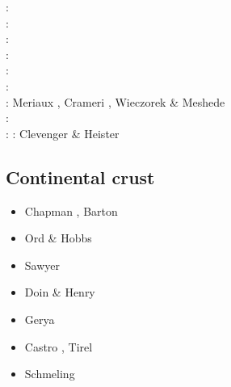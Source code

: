 \begin{scriptsize}
\twothousandtwelve: \cite{crsg12}\cite{chgv12}\cite{krwd12}\cite{may12}\cite{gerb12}\cite{asmo12}\\
\twothousandthirteen: \cite{chtl13}\cite{kemk13}\cite{gemd13}\cite{hutm13}\\
\twothousandfourteen: \cite{thmk14}\cite{mabl14}\cite{lopp14}\cite{stlh14}\\
\twothousandfifteen: \cite{lelk15}\cite{rumi15}\cite{chpe15}\cite{mabl15}\\
\twothousandsixteen: \cite{dumy16}\cite{blmp16}\\
\twothousandseventeen: \cite{robh17}\cite{wisv17}\cite{majc17}\\
\twothousandeighteen: Meriaux \etal \cite{memm18}, Crameri \cite{cram18}, Wieczorek \& Meshede \cite{wime18}\\
\twothousandnineteen: \cite{liki19}\cite{demh19}\cite{galb19}\cite{frtv19}\cite{yuwa19}\cite{ropu19}\\
\twothousandtwenty: \cite{homb20}\cite{trlb20}\cite{gadb20}\cite{jaca20a,jaca20b} 
\twothousandtwentyone: Clevenger \& Heister \cite{clhe21}
\end{scriptsize}

\subsection{Continental crust} 

\begin{scriptsize}
\begin{itemize}
\item[\nineteeneightysix] Chapman \cite{chap86}, Barton \cite{bart86}
\item[\nineteeneightynine] Ord \& Hobbs \cite{ord89}
\item[\nineteenninetyfour] Sawyer \cite{sawy94}
\item[\twothousandone] Doin \& Henry \cite{dohe01}
\item[\twothousandfour] Gerya \etal \cite{gepm04}
\item[\twothousandthirteen] Castro \etal \cite{cavg13}, Tirel \etal \cite{tibb13}
\item[\twothousandnineteen] Schmeling \etal \cite{scmw19}
\end{itemize}
\end{scriptsize}


